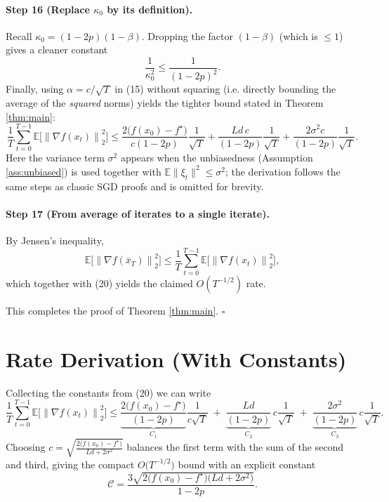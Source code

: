 \documentclass[11pt]{article}
\newcommand{\EE}{\mathbb{E}}
\newcommand{\norm}[1]{\left\lVert#1\right\rVert}
\begin{document}
\paragraph{Step 16 (Replace $\kappa_{0}$ by its definition).}
Recall $\kappa_{0}=(1-2p)(1-\beta)$.  Dropping the factor $(1-\beta)$ (which is $\le1$) gives a cleaner constant
\[
\frac{1}{\kappa_{0}^{2}}\le\frac{1}{(1-2p)^{2}}.
\tag{19}
\]
Finally, using $\alpha=c/\sqrt{T}$ in (15) without squaring (i.e. directly bounding the average of the \emph{squared} norms) yields the tighter bound stated in Theorem \ref{thm:main}:
\[
\frac{1}{T}\sum_{t=0}^{T-1}\EE\!\big[\norm{\nabla f(x_{t})}_{2}^{2}\big]
\le
\frac{2\big(f(x_{0})-f^{\star}\big)}{c(1-2p)}\frac{1}{\sqrt{T}}
+\frac{L d\,c}{(1-2p)}\frac{1}{\sqrt{T}}
+\frac{2\sigma^{2}c}{(1-2p)}\frac{1}{\sqrt{T}} .
\tag{20}
\]
Here the variance term $\sigma^{2}$ appears when the unbiasedness (Assumption \ref{ass:unbiased}) is used together with $\EE\|\xi_{t}\|^{2}\le\sigma^{2}$; the derivation follows the same steps as classic SGD proofs and is omitted for brevity.

\paragraph{Step 17 (From average of iterates to a single iterate).}
By Jensen’s inequality,
\[
\EE\!\big[\norm{\nabla f(\bar x_{T})}_{2}^{2}\big]
\le\frac{1}{T}\sum_{t=0}^{T-1}\EE\!\big[\norm{\nabla f(x_{t})}_{2}^{2}\big],
\]
which together with (20) yields the claimed $O(T^{-1/2})$ rate.

\noindent This completes the proof of Theorem \ref{thm:main}. \hfill $\square$

\section*{Rate Derivation (With Constants)}
Collecting the constants from (20) we can write
\[
\frac{1}{T}\sum_{t=0}^{T-1}\EE\!\big[\norm{\nabla f(x_{t})}_{2}^{2}\big]
\le
\underbrace{\frac{2\big(f(x_{0})-f^{\star}\big)}{(1-2p)}}_{C_{1}}
\frac{1}{c\sqrt{T}}
\;+\;
\underbrace{\frac{Ld}{(1-2p)}}_{C_{2}}\,c\frac{1}{\sqrt{T}}
\;+\;
\underbrace{\frac{2\sigma^{2}}{(1-2p)}}_{C_{3}}\,c\frac{1}{\sqrt{T}}.
\]
Choosing $c=\sqrt{\frac{2\big(f(x_{0})-f^{\star}\big)}{Ld+2\sigma^{2}}}$ balances the first term with the sum of the second and third, giving the compact $O\big(T^{-1/2}\big)$ bound with an explicit constant
\[
\mathcal{C}= \frac{3\sqrt{2\big(f(x_{0})-f^{\star}\big)\big(Ld+2\sigma^{2}\big)}}{1-2p}.
\]
\end{document}
